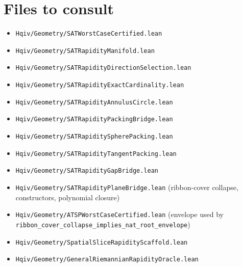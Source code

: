 \documentclass[11pt]{article}
\begin{document}
\section*{Files to consult}

\begin{itemize}[leftmargin=2em]
  \item \texttt{Hqiv/Geometry/SATWorstCaseCertified.lean}
  \item \texttt{Hqiv/Geometry/SATRapidityManifold.lean}
  \item \texttt{Hqiv/Geometry/SATRapidityDirectionSelection.lean}
  \item \texttt{Hqiv/Geometry/SATRapidityExactCardinality.lean}
  \item \texttt{Hqiv/Geometry/SATRapidityAnnulusCircle.lean}
  \item \texttt{Hqiv/Geometry/SATRapidityPackingBridge.lean}
  \item \texttt{Hqiv/Geometry/SATRapiditySpherePacking.lean}
  \item \texttt{Hqiv/Geometry/SATRapidityTangentPacking.lean}
  \item \texttt{Hqiv/Geometry/SATRapidityGapBridge.lean}
  \item \texttt{Hqiv/Geometry/SATRapidityPlaneBridge.lean} (ribbon-cover collapse, constructors, polynomial closure)
  \item \texttt{Hqiv/Geometry/ATSPWorstCaseCertified.lean} (envelope used by \texttt{ribbon\_cover\_collapse\_implies\_nat\_root\_envelope})
  \item \texttt{Hqiv/Geometry/SpatialSliceRapidityScaffold.lean}
  \item \texttt{Hqiv/Geometry/GeneralRiemannianRapidityOracle.lean}
\end{itemize}
\end{document}

